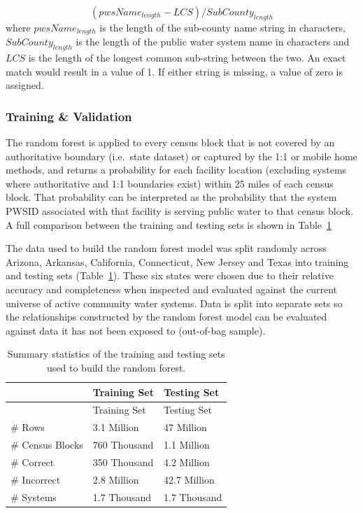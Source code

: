 \documentclass[12pt]{article}
\begin{document}
\[(pwsName_{length}-LCS)/SubCounty_{length}\] where \(pwsName_{length}\)
is the length of the sub-county name string in characters,
\(SubCounty_{length}\) is the length of the public water system name in
characters and \(LCS\) is the length of the longest common sub-string
between the two. An exact match would result in a value of 1. If either
string is missing, a value of zero is assigned.

\subsubsection{Training \& Validation}\label{training-validation}

The random forest is applied to every census block that is not covered
by an authoritative boundary (i.e.~state dataset) or captured by the 1:1
or mobile home methods, and returns a probability for each facility
location (excluding systems where authoritative and 1:1 boundaries
exist) within 25 miles of each census block. That probability can be
interpreted as the probability that the system PWSID associated with
that facility is serving public water to that census block. A full
comparison between the training and testing sets is shown in
Table~\ref{tbl-train}

The data used to build the random forest model was split randomly across
Arizona, Arkansas, California, Connecticut, New Jersey and Texas into
training and testing sets (Table~\ref{tbl-train}). These six states were
chosen due to their relative accuracy and completeness when inspected
and evaluated against the current universe of active community water
systems. Data is split into separate sets so the relationships
constructed by the random forest model can be evaluated against data it
has not been exposed to (out-of-bag sample).

\begin{longtable}[]{@{}lll@{}}
\caption{Summary statistics of the training and testing sets used to
build the random forest.}\label{tbl-train}\tabularnewline
\toprule\noalign{}
& Training Set & Testing Set \\
\midrule\noalign{}
\endfirsthead
\toprule\noalign{}
& Training Set & Testing Set \\
\midrule\noalign{}
\endhead
\bottomrule\noalign{}
\endlastfoot
\# Rows & 3.1 Million & 47 Million \\
\# Census Blocks & 760 Thousand & 1.1 Million \\
\# Correct & 350 Thousand & 4.2 Million \\
\# Incorrect & 2.8 Million & 42.7 Million \\
\# Systems & 1.7 Thousand & 1.7 Thousand \\
\end{longtable}
\end{document}
